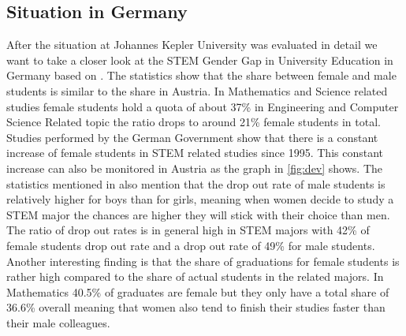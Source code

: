 \documentclass[12pt]{article}
\begin{document}
\subsection{Situation in Germany}
After the situation at Johannes Kepler University was evaluated in detail we want to take a closer look at the STEM Gender Gap in University Education in Germany based on \cite{schneider}. The statistics show that the share between female and male students is similar to the share in Austria. In Mathematics and Science related studies female students hold a quota of about  37\% in Engineering and Computer Science Related topic the ratio drops to around 21\% female students in total. Studies performed by the German Government show that there is a constant increase of female students in STEM related studies since 1995. This constant increase can also be monitored in Austria as the graph in \ref{fig:dev} shows.\newline
The statistics mentioned in \cite{schneider} also mention that the drop out rate of male students is relatively higher for boys than for girls, meaning when women decide to study a STEM major the chances are higher they will stick with their choice than men. The ratio of drop out rates is in general high in STEM majors with 42\% of female students drop out rate and a drop out rate of 49\% for male students.
Another interesting finding is that the share of graduations for female students is rather high compared to the share of actual students in the related majors. In Mathematics 40.5\% of graduates are female but they only have a total share of 36.6\%  overall meaning that women also tend to finish their studies faster than their male colleagues.
\end{document}
